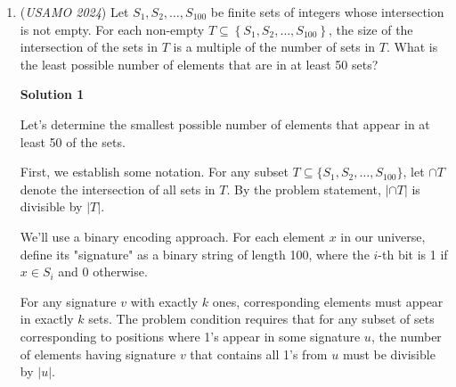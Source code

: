 \begin{enumerate}
 



\textbf{Solution 2}

We claim only $n = 3$ and $n = 4$ are the only two solutions. First, it is clear that both solutions work. 

 Next, we claim that $n < 5$. For $n \geq 5$, let $x$ be the smallest $x$ such that $x+1$ is not a factor of $n!$. Let the smallest factor larger than $x$ be $x+k$. 

 Now we consider $\frac{n!}{x-1}$, $\frac{n!}{x}$ and $\frac{n!}{x+k}$. Since $\frac{n!}{x-1} > \frac{n!}{x} > \frac{n!}{x+k}$, if $n$ were to satisfy the conditions, then $\frac{n!}{x-1}-\frac{n!}{x} \geq \frac{n!}{x} - \frac{n!}{x+k}$. However, note that this is not true for $x \geq 5$ and $k > 1$. 

 Note that the inequality is equivalent to showing $\frac{1}{x(x-1)} \geq \frac{k}{x(x+k)}$, which simplifies to $x+k \geq kx-k$, or $\frac{x}{x-2} \geq k \geq 2$. This implies $x \geq 2x-4$, $x \leq 4$, a contradiction, since the set of numbers $\{1, 2, 3, 4, 5\}$ are all factors of $n!$, and the value of $x$ must exist. Hence, no solutions for $n \geq 5$.

 


	\item (\textit{USAMO 2024}) Let $S_1, S_2, \ldots, S_{100}$ be finite sets of integers whose intersection is not empty. For each non-empty $T \subseteq\left\{S_1, S_2, \ldots, S_{100}\right\}$, the size of the intersection of the sets in $T$ is a multiple of the number of sets in $T$. What is the least possible number of elements that are in at least 50 sets?


 



\textbf{Solution 1}

Let's determine the smallest possible number of elements that appear in at least 50 of the sets.

 First, we establish some notation. For any subset $T \subseteq \{S_1, S_2, \ldots, S_{100}\}$, let $\cap T$ denote the intersection of all sets in $T$. By the problem statement, $|\cap T|$ is divisible by $|T|$.

 We'll use a binary encoding approach. For each element $x$ in our universe, define its "signature" as a binary string of length 100, where the $i$-th bit is 1 if $x \in S_i$ and 0 otherwise.

 For any signature $v$ with exactly $k$ ones, corresponding elements must appear in exactly $k$ sets. The problem condition requires that for any subset of sets corresponding to positions where 1's appear in some signature $u$, the number of elements having signature $v$ that contains all 1's from $u$ must be divisible by $|u|$.


\end{enumerate}
